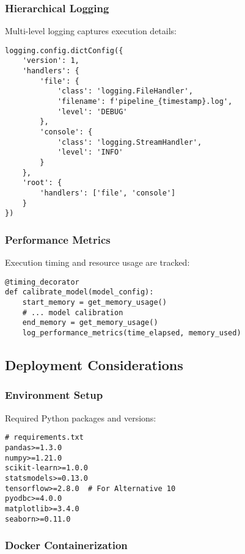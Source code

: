 \subsubsection{Hierarchical Logging}

Multi-level logging captures execution details:

\begin{verbatim}
logging.config.dictConfig({
    'version': 1,
    'handlers': {
        'file': {
            'class': 'logging.FileHandler',
            'filename': f'pipeline_{timestamp}.log',
            'level': 'DEBUG'
        },
        'console': {
            'class': 'logging.StreamHandler',
            'level': 'INFO'
        }
    },
    'root': {
        'handlers': ['file', 'console']
    }
})
\end{verbatim}

\subsubsection{Performance Metrics}

Execution timing and resource usage are tracked:

\begin{verbatim}
@timing_decorator
def calibrate_model(model_config):
    start_memory = get_memory_usage()
    # ... model calibration
    end_memory = get_memory_usage()
    log_performance_metrics(time_elapsed, memory_used)
\end{verbatim}

\subsection{Deployment Considerations}

\subsubsection{Environment Setup}

Required Python packages and versions:

\begin{verbatim}
# requirements.txt
pandas>=1.3.0
numpy>=1.21.0
scikit-learn>=1.0.0
statsmodels>=0.13.0
tensorflow>=2.8.0  # For Alternative 10
pyodbc>=4.0.0
matplotlib>=3.4.0
seaborn>=0.11.0
\end{verbatim}

\subsubsection{Docker Containerization}

